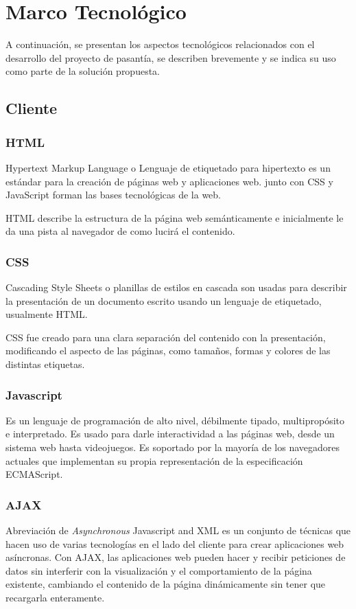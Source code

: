 ﻿\chapter{Marco Tecnológico}
\thispagestyle{empty} %

A continuación, se presentan los aspectos tecnológicos relacionados con el desarrollo del proyecto de pasantía, se describen brevemente y se indica su uso como parte de la solución propuesta.

\section{Cliente}

\subsection{HTML}

Hypertext Markup Language o Lenguaje de etiquetado para hipertexto es un estándar para la creación de páginas web y aplicaciones web. junto con CSS y JavaScript forman las bases tecnológicas de la web.

HTML describe la estructura de la página web semánticamente e inicialmente le da una pista al navegador de como lucirá el contenido.


\subsection{CSS}
Cascading Style Sheets o planillas de estilos en cascada son usadas para describir la presentación de un documento escrito usando un lenguaje de etiquetado, usualmente HTML. 

CSS fue creado para una clara separación del contenido con la presentación, modificando el aspecto de las páginas, como tamaños, formas y colores de las distintas etiquetas.

\subsection{Javascript}
Es un lenguaje de programación de alto nivel, débilmente tipado, multipropósito e interpretado. Es usado para darle interactividad a las páginas web, desde un sistema web hasta videojuegos. Es soportado por la mayoría de los navegadores actuales que implementan su propia representación de la especificación ECMAScript.

\subsection{AJAX}
Abreviación de \emph{Asynchronous} Javascript and XML es un conjunto de técnicas que hacen uso de varias tecnologías en el lado del cliente para crear aplicaciones web asíncronas. Con AJAX, las aplicaciones web pueden hacer y recibir peticiones de datos sin interferir con la visualización y el comportamiento de la página existente, cambiando el contenido de la página dinámicamente sin tener que recargarla enteramente.

